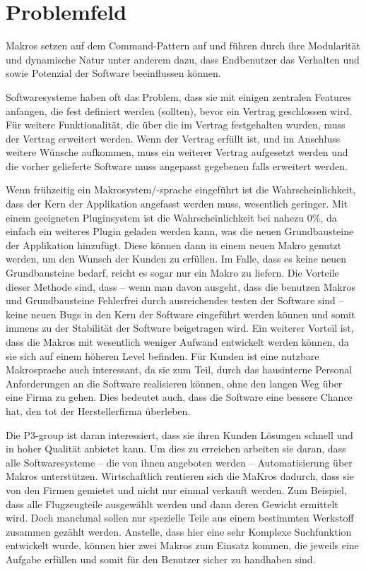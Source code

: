 \section{Problemfeld}
\label{sec:problemfeld}
  Makros setzen auf dem Command-Pattern auf und führen durch ihre Modularität und dynamische Natur unter anderem dazu, dass Endbenutzer das Verhalten und sowie Potenzial der Software beeinflussen können.

  Softwaresysteme haben oft das Problem, dass sie mit einigen zentralen Features anfangen, die fest definiert werden (sollten), bevor ein Vertrag geschlossen wird. Für weitere Funktionalität, die über die im Vertrag festgehalten wurden, muss der Vertrag erweitert werden. Wenn der Vertrag erfüllt ist, und im Anschluss weitere Wünsche aufkommen, muss ein weiterer Vertrag aufgesetzt werden und die vorher gelieferte Software muss angepasst gegebenen falls erweitert werden.

  Wenn frühzeitig ein Makrosystem/-sprache eingeführt ist die Wahrscheinlichkeit, dass der Kern der Applikation angefasst werden muss, wesentlich geringer. Mit einem geeigneten Pluginsystem ist die Wahrscheinlichkeit bei nahezu $0\%$, da einfach ein weiteres Plugin geladen werden kann, was die neuen Grundbausteine der Applikation hinzufügt. Diese können dann in einem neuen Makro genutzt werden, um den Wunsch der Kunden zu erfüllen. Im Falle, dass es keine neuen Grundbausteine bedarf, reicht es sogar nur ein Makro zu liefern. Die Vorteile dieser Methode sind, dass -- wenn man davon ausgeht, dass die benutzen Makros und Grundbausteine Fehlerfrei durch ausreichendes testen der Software sind -- keine neuen Bugs in den Kern der Software eingeführt werden können und somit immens zu der Stabilität der Software beigetragen wird. Ein weiterer Vorteil ist, dass die Makros mit wesentlich weniger Aufwand entwickelt werden können, da sie sich auf einem höheren Level befinden. Für Kunden ist eine nutzbare Makrosprache auch interessant, da sie zum Teil, durch das hausinterne Personal Anforderungen an die Software realisieren können, ohne den langen Weg über eine Firma zu gehen. Dies bedeutet auch, dass die Software eine bessere Chance hat, den tot der Herstellerfirma überleben.

  Die P3-group ist daran interessiert, dass sie ihren Kunden Lösungen schnell und in hoher Qualität anbietet kann. Um dies zu erreichen arbeiten sie daran, dass alle Softwaresysteme -- die von ihnen angeboten werden -- Automatisierung über Makros unterstützen. Wirtschaftlich rentieren sich die MaKros dadurch, dass sie von den Firmen gemietet und nicht nur einmal verkauft werden. Zum Beispiel, dass alle Flugzeugteile ausgewählt werden und dann deren Gewicht ermittelt wird. Doch manchmal sollen nur spezielle Teile aus einem bestimmten Werkstoff zusammen gezählt werden. Anstelle, dass hier eine sehr Komplexe Suchfunktion entwickelt wurde, können hier zwei Makros zum Einsatz kommen, die jeweils eine Aufgabe erfüllen und somit für den Benutzer sicher zu handhaben sind.

